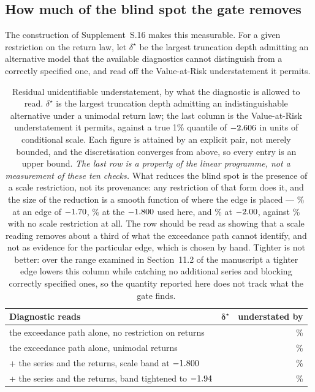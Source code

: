 \documentclass[preprint,11pt,authoryear]{elsarticle}
\newcommand{\1}{\boldsymbol{1}}
\begin{document}
\subsection{How much of the blind spot the gate removes}
\label{app:gate_residual}

The construction of Supplement~S.16 makes this measurable. For
a given restriction on the return law, let $\delta^\star$ be the largest
truncation depth admitting an alternative model that the available diagnostics
cannot distinguish from a correctly specified one, and read off the
Value-at-Risk understatement it permits.

\begin{table}[htbp]
	\centering
	\caption{Residual unidentifiable understatement, by what the diagnostic is
		allowed to read. $\delta^\star$ is the largest truncation depth admitting
		an indistinguishable alternative under a unimodal return law; the last
		column is the Value-at-Risk understatement it permits, against a true 1\%
		quantile of $-2.606$ in units of conditional scale. Each figure is
		attained by an explicit pair, not merely bounded, and the discretisation
		converges from above, so every entry is an upper bound.
		\emph{The last row is a property of the linear programme, not a
		measurement of these ten checks.} What reduces the blind spot is the
		presence of a scale restriction, not its provenance: any restriction of
		that form does it, and the size of the reduction is a smooth function of
		where the edge is placed --- \nUndBandLoose\% at an edge of
		$-1.70$, \nGapUndGateNow\% at the $-1.800$ used here, and
		\nUndBandStrict\% at $-2.00$, against \nGapUndUni\% with no scale
		restriction at all. The row should be read as showing that a scale
		reading removes about a third of what the exceedance path cannot
		identify, and not as evidence for the particular edge, which is chosen
		by hand. Tighter is not better: over the range examined in
		Section~11.2 of the manuscript a tighter edge lowers this column while
		catching no additional series and blocking correctly specified ones, so
		the quantity reported here does not track what the gate finds.}
	\label{tab:gate_residual}
	\footnotesize
	\setlength{\tabcolsep}{5pt}
	\begin{tabular}{@{}>{\raggedright\arraybackslash}p{7.2cm}rr@{}}
		\toprule
		\textbf{Diagnostic reads} & $\bm{\delta^\star}$ & \textbf{understated by} \\
		\midrule
		the exceedance path alone, no restriction on returns & \nGapDeltaFree & \nGapUndFree\% \\
		the exceedance path alone, unimodal returns & \nGapDeltaUni & \nGapUndUni\% \\
		\addlinespace[2pt]
		\quad + the series and the returns, scale band at $-1.800$ & \nGapDeltaGateNow & \nGapUndGateNow\% \\
		\quad + the series and the returns, band tightened to $-1.94$ & \nTightDelta & \nTightUnd\% \\
		\bottomrule
	\end{tabular}
\end{table}
\end{document}
